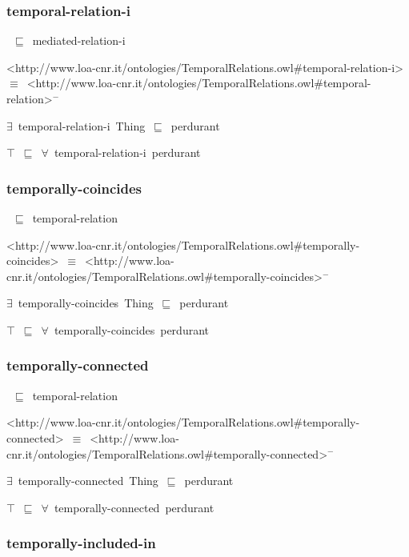 \documentclass{article}
\begin{document}
\subsubsection*{temporal-relation-i}

~\ensuremath{\sqsubseteq}~mediated-relation-i

<http://www.loa-cnr.it/ontologies/TemporalRelations.owl#temporal-relation-i>~\ensuremath{\equiv}~<http://www.loa-cnr.it/ontologies/TemporalRelations.owl#temporal-relation>\ensuremath{^-}

\ensuremath{\exists}~temporal-relation-i~Thing~\ensuremath{\sqsubseteq}~perdurant

\ensuremath{\top}~\ensuremath{\sqsubseteq}~\ensuremath{\forall}~temporal-relation-i~perdurant

\subsubsection*{temporally-coincides}

~\ensuremath{\sqsubseteq}~temporal-relation

<http://www.loa-cnr.it/ontologies/TemporalRelations.owl#temporally-coincides>~\ensuremath{\equiv}~<http://www.loa-cnr.it/ontologies/TemporalRelations.owl#temporally-coincides>\ensuremath{^-}

\ensuremath{\exists}~temporally-coincides~Thing~\ensuremath{\sqsubseteq}~perdurant

\ensuremath{\top}~\ensuremath{\sqsubseteq}~\ensuremath{\forall}~temporally-coincides~perdurant

\subsubsection*{temporally-connected}

~\ensuremath{\sqsubseteq}~temporal-relation

<http://www.loa-cnr.it/ontologies/TemporalRelations.owl#temporally-connected>~\ensuremath{\equiv}~<http://www.loa-cnr.it/ontologies/TemporalRelations.owl#temporally-connected>\ensuremath{^-}

\ensuremath{\exists}~temporally-connected~Thing~\ensuremath{\sqsubseteq}~perdurant

\ensuremath{\top}~\ensuremath{\sqsubseteq}~\ensuremath{\forall}~temporally-connected~perdurant

\subsubsection*{temporally-included-in}
\end{document}
